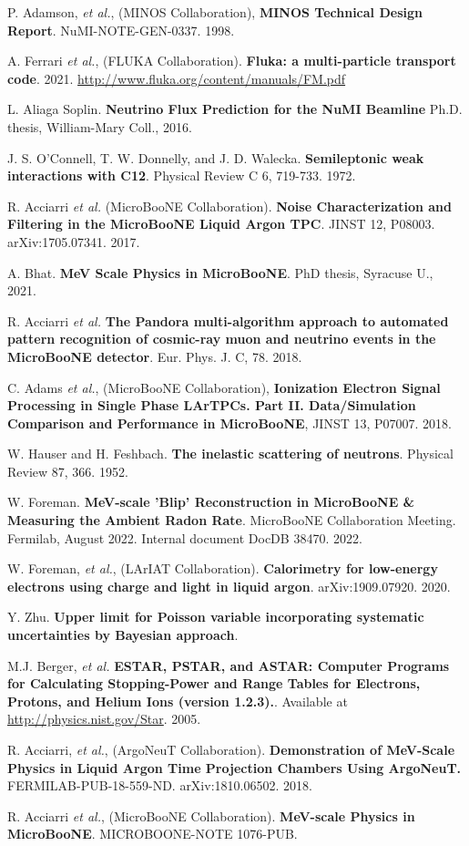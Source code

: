  P. Adamson, \textit{et al.}, (MINOS Collaboration), \textbf{MINOS Technical Design Report}. NuMI-NOTE-GEN-0337. 1998.

 A. Ferrari \textit{et al.}, (FLUKA Collaboration). \textbf{Fluka:
a multi-particle transport code}. 2021. \href{http://www.fluka.org/content/manuals/FM.pdf
}{http://www.fluka.org/content/manuals/FM.pdf}

 L. Aliaga Soplin. \textbf{Neutrino Flux Prediction for the NuMI Beamline} Ph.D. thesis, William-Mary Coll., 2016.

 J. S. O’Connell, T. W. Donnelly, and J. D. Walecka. \textbf{Semileptonic weak interactions with C12}. Physical Review C 6, 719-733. 1972.

 R. Acciarri \textit{et al.} (MicroBooNE Collaboration). \textbf{Noise Characterization and Filtering in the MicroBooNE Liquid Argon TPC}. JINST 12, P08003. arXiv:1705.07341. 2017. 

 A. Bhat. \textbf{MeV Scale Physics in MicroBooNE}. PhD thesis, Syracuse U., 2021.

 R. Acciarri \textit{et al.} \textbf{The Pandora multi-algorithm approach to automated pattern recognition of cosmic-ray muon and neutrino events in the MicroBooNE detector}. Eur. Phys. J. C, 78. 2018.

 C. Adams \textit{et al.}, (MicroBooNE Collaboration), \textbf{Ionization Electron Signal Processing in Single Phase LArTPCs. Part II. Data/Simulation Comparison and Performance in MicroBooNE}, JINST 13, P07007. 2018.

 W. Hauser and H. Feshbach. \textbf{The inelastic scattering of neutrons}. Physical Review 87, 366. 1952.
 
 W. Foreman. \textbf{MeV-scale 'Blip' Reconstruction in MicroBooNE \&
Measuring the Ambient Radon Rate}. MicroBooNE Collaboration Meeting. Fermilab, August 2022. Internal document DocDB 38470. 2022. 

 W. Foreman, \textit{et al.}, (LArIAT Collaboration). \textbf{Calorimetry for low-energy electrons using charge and light in liquid argon}. arXiv:1909.07920. 2020.

 Y. Zhu. \textbf{Upper limit for Poisson variable incorporating systematic uncertainties by Bayesian approach}.

  M.J. Berger, \textit{et al.} \textbf{ESTAR, PSTAR, and ASTAR: Computer Programs for Calculating Stopping-Power and Range Tables for Electrons, Protons, and Helium Ions (version 1.2.3).}. Available at \href{http://physics.nist.gov/Star}{http://physics.nist.gov/Star}. 2005.

 R. Acciarri, \textit{et al.}, (ArgoNeuT Collaboration). \textbf{Demonstration of MeV-Scale Physics in
Liquid Argon Time Projection Chambers Using ArgoNeuT.} FERMILAB-PUB-18-559-ND. arXiv:1810.06502. 2018.

 R. Acciarri \textit{et al.}, (MicroBooNE Collaboration). \textbf{MeV-scale Physics in MicroBooNE}. MICROBOONE-NOTE 1076-PUB. 